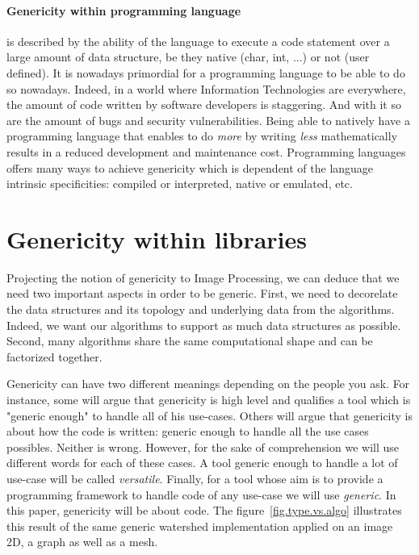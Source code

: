 \paragraph{Genericity within programming language} is described by the ability of the language to execute a code
statement over a large amount of data structure, be they native (char, int, ...) or not (user defined). It is nowadays
primordial for a programming language to be able to do so nowadays. Indeed, in a world where Information Technologies
are everywhere, the amount of code written by software developers is staggering. And with it so are the amount of bugs
and security vulnerabilities. Being able to natively have a programming language that enables to do \emph{more} by
writing \emph{less} mathematically results in a reduced development and maintenance cost. Programming languages offers
many ways to achieve genericity which is dependent of the language intrinsic specificities: compiled or interpreted,
native or emulated, etc.


\section{Genericity within libraries}

Projecting the notion of genericity to Image Processing, we can deduce that we need two important aspects in order to be
generic. First, we need to decorelate the data structures and its topology and underlying data from the algorithms.
Indeed, we want our algorithms to support as much data structures as possible. Second, many algorithms share the same
computational shape and can be factorized together.

Genericity can have two different meanings depending on the people you ask. For instance, some will argue that
genericity is high level and qualifies a tool which is "generic enough" to handle all of his use-cases. Others will
argue that genericity is about how the code is written: generic enough to handle all the use cases possibles. Neither is
wrong. However, for the sake of comprehension we will use different words for each of these cases. A tool generic enough
to handle a lot of use-case will be called \emph{versatile}. Finally, for a tool whose aim is to provide a programming
framework to handle code of any use-case we will use \emph{generic}. In this paper, genericity will be about code. The
figure~\ref{fig.type.vs.algo} illustrates this result of the same generic watershed implementation applied on an image
2D, a graph as well as a mesh.

